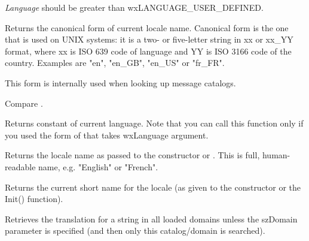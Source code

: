 {\it Language} should be greater than wxLANGUAGE\_USER\_DEFINED.



\label{wxlocalegetcanonicalname}


Returns the canonical form of current locale name. Canonical form is the
one that is used on UNIX systems: it is a two- or five-letter string in xx or
xx\_YY format, where xx is ISO 639 code of language and YY is ISO 3166 code of
the country. Examples are "en", "en\_GB", "en\_US" or "fr\_FR".

This form is internally used when looking up message catalogs.

Compare .



\label{wxlocalegetlanguage}


Returns  constant of current language.
Note that you can call this function only if you used the form of
 that takes wxLanguage argument.


\label{wxlocalegetlocale}


Returns the locale name as passed to the constructor or 
. This is full, human-readable name,
e.g. "English" or "French".


\label{wxlocalegetname}


Returns the current short name for the locale (as given to the constructor or
the Init() function).

\label{wxlocalegetstring}


Retrieves the translation for a string in all loaded domains unless the szDomain
parameter is specified (and then only this catalog/domain is searched).


